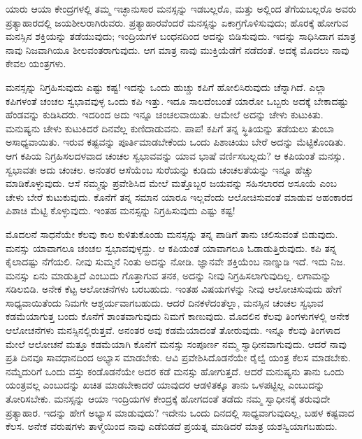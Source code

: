 \newpage

ಯಾರು ಆಯಾ ಕೇಂದ್ರಗಳಲ್ಲಿ ತಮ್ಮ ಇಚ್ಛಾನುಸಾರ ಮನಸ್ಸನ್ನು ಇಡಬಲ್ಲರೊ, ಮತ್ತು ಅಲ್ಲಿಂದ ತೆಗೆಯಬಲ್ಲರೊ ಅವರು ಪ್ರತ್ಯಾಹಾರದಲ್ಲಿ ಜಯಶೀಲರಾಗಿರುವರು. ಪ್ರತ್ಯಾಹಾರವೆಂದರೆ ಮನಸ್ಸನ್ನು ಏಕಾಗ್ರಗೊಳಿಸುವುದು; ಹೊರಕ್ಕೆ ಹೋಗುವ ಮನಸ್ಸಿನ ಶಕ್ತಿಯನ್ನು ತಡೆಯುವುದು; ಇಂದ್ರಿಯಗಳ ಬಂಧನದಿಂದ ಅದನ್ನು ಬಿಡಿಸುವುದು. ಇದನ್ನು ಸಾಧಿಸಿದಾಗ ಮಾತ್ರ ನಾವು ನಿಜವಾಗಿಯೂ ಶೀಲವಂತರಾಗುವುದು. ಆಗ ಮಾತ್ರ ನಾವು ಮುಕ್ತಿಯೆಡೆಗೆ ನಡೆದಂತೆ. ಅದಕ್ಕೆ ಮೊದಲು ನಾವು ಕೇವಲ ಯಂತ್ರಗಳು. 

ಮನಸ್ಸನ್ನು ನಿಗ್ರಹಿಸುವುದು ಎಷ್ಟು ಕಷ್ಟ! ಇದನ್ನು ಒಂದು ಹುಚ್ಚು ಕಪಿಗೆ ಹೋಲಿಸಿರುವುದು ಚೆನ್ನಾಗಿದೆ. ಎಲ್ಲಾ ಕಪಿಗಳಂತೆ ಚಂಚಲ ಸ್ವಭಾವವುಳ್ಳ ಒಂದು ಕಪಿ ಇತ್ತು. ಇದೂ ಸಾಲದೆಂಬಂತೆ ಯಾರೋ ಒಬ್ಬರು ಅದಕ್ಕೆ ಬೇಕಾದಷ್ಟು ಹೆಂಡವನ್ನು ಕುಡಿಸಿದರು. ಇದರಿಂದ ಅದು ಇನ್ನೂ ಚಂಚಲವಾಯಿತು. ಆಮೇಲೆ ಅದನ್ನು ಚೇಳು ಕುಟುಕಿತು. ಮನುಷ್ಯನು ಚೇಳು ಕುಟುಕಿದರೆ ದಿನವೆಲ್ಲ ಕುಣಿದಾಡುವನು. ಪಾಪ! ಕಪಿಗೆ ತನ್ನ ಸ್ಥಿತಿಯನ್ನು ತಡೆಯಲು ತುಂಬಾ ಅಸಾಧ್ಯವಾಯಿತು. ಇರುವ ಕಷ್ಟವನ್ನು ಪೂರ್ತಿಮಾಡಬೇಕೆಂದು ಒಂದು ಪಿಶಾಚಿಯು ಬೇರೆ ಅದನ್ನು ಮೆಟ್ಟಿಕೊಂಡಿತು. ಆಗ ಕಪಿಯ ನಿಗ್ರಹಿಸಲದಳವಾದ ಚಂಚಲ ಸ್ವಭಾವವನ್ನು ಯಾವ ಭಾಷೆ ವರ್ಣಿಸಬಲ್ಲದು? ಆ ಕಪಿಯಂತೆ ಮನಸ್ಸು. ಸ್ವಭಾವತಃ ಅದು ಚಂಚಲ. ಅನಂತರ ಆಸೆಯೆಂಬ ಸುರೆಯನ್ನು ಕುಡಿದು ಚಂಚಲತೆಯನ್ನು ಇನ್ನೂ ಹೆಚ್ಚು ಮಾಡಿಕೊಳ್ಳುವುದು. ಆಸೆ ನಮ್ಮನ್ನು ಪ್ರವೇಶಿಸಿದ ಮೇಲೆ ಮತ್ತೊಬ್ಬರ ಜಯವನ್ನು ಸಹಿಸಲಾರದ ಅಸೂಯೆ ಎಂಬ ಚೇಳು ಬೇರೆ ಕುಟುಕುವುದು. ಕೊನೆಗೆ ತನ್ನ ಸಮಾನ ಯಾರೂ ಇಲ್ಲವೆಂದು ಆಲೋಚಿಸುವಂತೆ ಮಾಡುವ ಅಹಂಕಾರದ ಪಿಶಾಚಿ ಮೆಟ್ಟಿ ಕೊಳ್ಳುವುದು. ಇಂತಹ ಮನಸ್ಸನ್ನು ನಿಗ್ರಹಿಸುವುದು ಎಷ್ಟು ಕಷ್ಟ!

ಮೊದಲನೆ ಸಾಧನೆಯೇ ಕೆಲವು ಕಾಲ ಕುಳಿತುಕೊಂಡು ಮನಸ್ಸನ್ನು ತನ್ನ ಪಾಡಿಗೆ ತಾನು ಚಲಿಸುವಂತೆ ಬಿಡುವುದು. ಮನಸ್ಸು ಯಾವಾಗಲೂ ಚಂಚಲ ಸ್ವಭಾವವುಳ್ಳದ್ದು. ಆ ಕಪಿಯಂತೆ ಯಾವಾಗಲೂ ಓಡಾಡುತ್ತಿರುವುದು. ಕಪಿ ತನ್ನ ಕೈಲಾದಷ್ಟು ನೆಗೆಯಲಿ. ನೀವು ಸುಮ್ಮನೆ ನಿಂತು ಅದನ್ನು ನೋಡಿ. ಜ್ಞಾನವೇ ಶಕ್ತಿಯೆಂಬ ನಾಣ್ನುಡಿ ಇದೆ. ಇದು ನಿಜ. ಮನಸ್ಸು ಏನು ಮಾಡುತ್ತಿದೆ ಎಂಬುದು ಗೊತ್ತಾಗುವ ತನಕ, ಅದನ್ನು ನೀವು ನಿಗ್ರಹಿಸಲಾಗುವುದಿಲ್ಲ. ಲಗಾಮನ್ನು ಸಡಿಲಬಿಡಿ. ಅನೇಕ ಕೆಟ್ಟ ಆಲೋಚನೆಗಳು ಬರಬಹುದು. ಇಂತಹ ವಿಷಯಗಳನ್ನು ನೀವು ಆಲೋಚಿಸುವುದು ಹೇಗೆ ಸಾಧ್ಯವಾಯಿತೆಂದು ನಿಮಗೇ ಆಶ್ಚರ್ಯವಾಗಬಹುದು. ಆದರೆ ದಿನಕಳೆದಂತೆಲ್ಲಾ, ಮನಸ್ಸಿನ ಚಂಚಲ ಸ್ವಭಾವ ಕಡಮೆಯಾಗುತ್ತ ಬಂದು ಕೊನೆಗೆ ಶಾಂತವಾಗುವುದು ನಿಮಗೆ ಕಾಣುವುದು. ಮೊದಲಿನ ಕೆಲವು ತಿಂಗಳುಗಳಲ್ಲಿ ಅನೇಕ ಆಲೋಚನೆಗಳು ಮನಸ್ಸಿನಲ್ಲಿರುತ್ತವೆ. ಅನಂತರ ಅವು ಕಡಮೆಯಾದಂತೆ ತೋರುವುದು. ಇನ್ನೂ ಕೆಲವು ತಿಂಗಳಾದ ಮೇಲೆ ಆಲೋಚನೆ ಮತ್ತೂ ಕಡಮೆಯಾಗಿ ಕೊನೆಗೆ ಮನಸ್ಸು ಸಂಪೂರ್ಣ ನಮ್ಮ ಸ್ವಾಧೀನವಾಗುವುದು. ಆದರೆ ನಾವು ಪ್ರತಿ ದಿನವೂ ಸಾವಧಾನದಿಂದ ಅಭ್ಯಾಸ ಮಾಡಬೇಕು. ಆವಿ ಪ್ರವೇಶಿಸಿದೊಡನೆಯೇ ರೈಲ್ವೆ ಯಂತ್ರ ಕೆಲಸ ಮಾಡಬೇಕು. ನಮ್ಮೆದುರಿಗೆ ಒಂದು ವಸ್ತು ಕಂಡೊಡನೆಯೇ ಅದರ ಕಡೆ ಮನಸ್ಸು ಹೋಗುತ್ತದೆ. ಆದರೆ ಮನುಷ್ಯನು ತಾನು ಒಂದು ಯಂತ್ರವಲ್ಲ ಎಂಬುದನ್ನು ಖಚಿತ ಮಾಡಬೇಕಾದರೆ ಯಾವುದರ ಆಡಳಿತಕ್ಕೂ ತಾನು ಒಳಪಟ್ಟಿಲ್ಲ ಎಂಬುದನ್ನು ತೋರಿಸಬೇಕು. ಮನಸ್ಸನ್ನು ಆಯಾ ಇಂದ್ರಿಯಗಳ ಕೇಂದ್ರಕ್ಕೆ ಹೋಗದಂತೆ ತಡೆದು ನಮ್ಮ ಸ್ವಾಧೀನಕ್ಕೆ ತರುವುದೇ ಪ್ರತ್ಯಾಹಾರ. ಇದನ್ನು ಹೇಗೆ ಅಭ್ಯಾಸ ಮಾಡುವುದು? ಇದೇನು ಒಂದು ದಿನದಲ್ಲಿ ಸಾಧ್ಯವಾಗುವುದಿಲ್ಲ, ಬಹಳ ಕಷ್ಟವಾದ ಕೆಲಸ. ಅನೇಕ ವರುಷಗಳು ತಾಳ್ಮೆಯಿಂದ ನಾವು ಎಡೆಬಿಡದೆ ಪ್ರಯತ್ನ ಮಾಡಿದರೆ ಮಾತ್ರ ಯಶಸ್ವಿಯಾಗಬಹುದು. 

